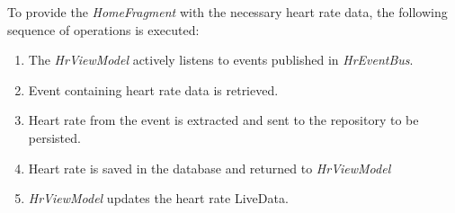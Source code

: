 To provide the \emph{HomeFragment} with the necessary heart rate data, the following sequence of operations is executed:
\begin{enumerate}
    \item The \emph{HrViewModel} actively listens to events published in \emph{HrEventBus}.
    \item Event containing heart rate data is retrieved.
    \item Heart rate from the event is extracted and sent to the repository to be persisted.
    \item Heart rate is saved in the database and returned to \emph{HrViewModel}
    \item \emph{HrViewModel} updates the heart rate LiveData.
\end{enumerate}